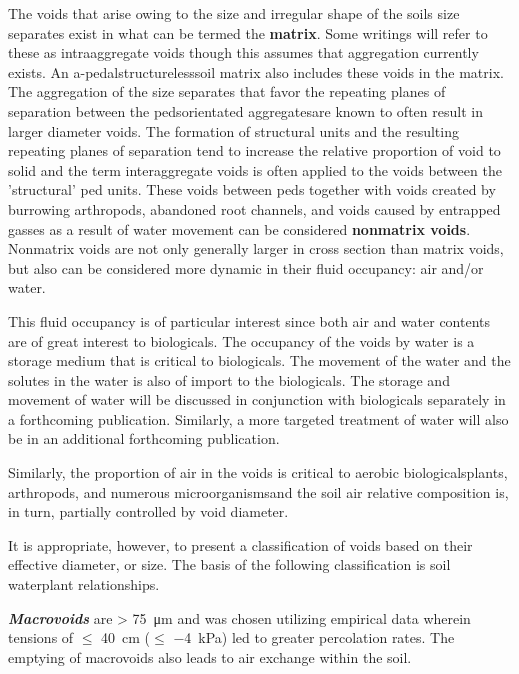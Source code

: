\documentclass[letterpaper, 12pt]{article}
\begin{document}
The voids that arise owing to the size and irregular shape of the soils size separates exist in what can be termed the \textbf{matrix}. Some writings will refer to these as intraaggregate voids though this assumes that aggregation currently exists. An a-pedal\textemdash{}structureless\textemdash{}soil matrix also includes these voids in the matrix. The aggregation of the size separates that favor the repeating planes of separation between the peds\textemdash{}orientated aggregates\textemdash{}are known to often result in larger diameter voids. The formation of structural units and the resulting repeating planes of separation tend to increase the relative proportion of void to solid and the term interaggregate voids is often applied to the voids between the 'structural' ped units. These voids between peds together with voids created by burrowing arthropods, abandoned root channels, and voids caused by entrapped gasses as a result of water movement can be considered \textbf{nonmatrix voids}. Nonmatrix voids are not only generally larger in cross section than matrix voids, but also can be considered more dynamic in their fluid occupancy: air and/or water.  


This fluid occupancy is of particular interest since both air and water contents are of great interest to biologicals. The occupancy of the voids by water is a storage medium that is critical to biologicals. The movement of the water and the solutes in the water is also of import to the biologicals. The storage and movement of water will be discussed in conjunction with biologicals separately in a forthcoming publication. Similarly, a more targeted treatment of water will also be in an additional forthcoming publication.  

Similarly, the proportion of air in the voids is critical to aerobic biologicals\textemdash{}plants, arthropods, and numerous microorganisms\textemdash{}and the soil air relative composition is, in turn, partially controlled by void diameter.

It is appropriate, however, to present a classification of voids based on their effective diameter, or size. The basis of the following classification is soil water\textemdash{}plant relationships.  

\textbf{\textit{Macrovoids}} are \qty{> 75}{\micro\metre} and was chosen utilizing empirical data wherein tensions of $\leq$ \qty{40}{\centi\meter} ($\leq$ \qty{-4}{kPa}) led to greater percolation rates. The emptying of macrovoids also leads to air exchange within the soil.  
\end{document}
